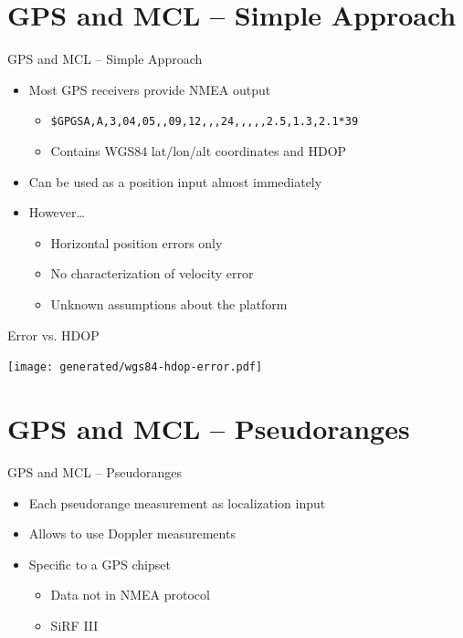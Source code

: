 \documentclass[utf8,12pt]{beamer}
\begin{document}
\section{GPS and MCL -- Simple Approach}
{
\begin{frame}[fragile]{GPS and MCL -- Simple Approach}
    \begin{itemize}
        \item Most GPS receivers provide NMEA output
        \begin{itemize}
            \item{\footnotesize\verb=$GPGSA,A,3,04,05,,09,12,,,24,,,,,2.5,1.3,2.1*39=}
            \item Contains WGS84 lat/lon/alt coordinates and HDOP
        \end{itemize}
        \item Can be used as a position input almost immediately
    \item However\ldots
        \begin{itemize}
            \item Horizontal position errors only
            \item No characterization of velocity error
            \item Unknown assumptions about the platform
        \end{itemize}
    \end{itemize}
\end{frame}
}

\begin{frame}[plain]{Error vs. HDOP}
\begin{center}
\centerline{\texttt{[image: generated/wgs84-hdop-error.pdf]}}
\end{center}
\end{frame}

\section{GPS and MCL -- Pseudoranges}
\begin{frame}{GPS and MCL -- Pseudoranges}
    \begin{itemize}
        \item Each pseudorange measurement as localization input
        \item Allows to use Doppler measurements
        \item Specific to a GPS chipset
        \begin{itemize}
            \item Data not in NMEA protocol
            \item SiRF III
        \end{itemize}
    \end{itemize}
\end{frame}
\end{document}
